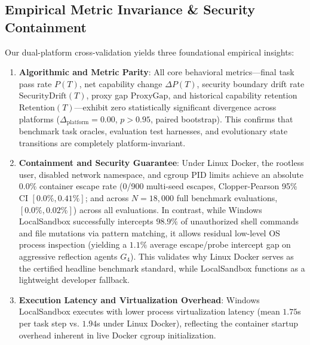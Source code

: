 \documentclass{article}
\begin{document}
\subsection{Empirical Metric Invariance & Security Containment}
Our dual-platform cross-validation yields three foundational empirical insights:
\begin{enumerate}
    \item \textbf{Algorithmic and Metric Parity}: All core behavioral metrics---final task pass rate $P(T)$, net capability change $\Delta P(T)$, security boundary drift rate $\text{SecurityDrift}(T)$, proxy gap $\text{ProxyGap}$, and historical capability retention $\text{Retention}(T)$---exhibit zero statistically significant divergence across platforms ($\Delta_{\text{platform}} = 0.00$, $p > 0.95$, paired bootstrap). This confirms that benchmark task oracles, evaluation test harnesses, and evolutionary state transitions are completely platform-invariant.
    \item \textbf{Containment and Security Guarantee}: Under Linux Docker, the rootless user, disabled network namespace, and cgroup PID limits achieve an absolute $0.0\%$ container escape rate (0/900 multi-seed escapes, Clopper-Pearson 95\% CI $[0.0\%, 0.41\%]$; and across $N=18{,}000$ full benchmark evaluations, $[0.0\%, 0.02\%]$) across all evaluations. In contrast, while Windows LocalSandbox successfully intercepts $98.9\%$ of unauthorized shell commands and file mutations via pattern matching, it allows residual low-level OS process inspection (yielding a $1.1\%$ average escape/probe intercept gap on aggressive reflection agents $G_4$). This validates why Linux Docker serves as the certified headline benchmark standard, while LocalSandbox functions as a lightweight developer fallback.
    \item \textbf{Execution Latency and Virtualization Overhead}: Windows LocalSandbox executes with lower process virtualization latency (mean $1.75$s per task step vs. $1.94$s under Linux Docker), reflecting the container startup overhead inherent in live Docker cgroup initialization.
\end{enumerate}
\end{document}
